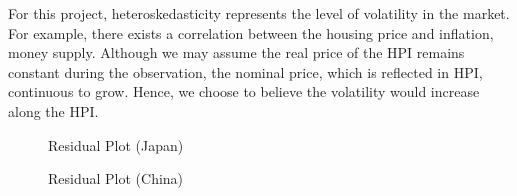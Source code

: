 \documentclass[11pt]{article}
\begin{document}
For this project, heteroskedasticity represents the level of volatility in the market. For example, there exists a correlation between the housing price and inflation, money supply. Although we may assume the real price of the HPI remains constant during the observation, the nominal price, which is reflected in HPI, continuous to grow. Hence, we choose to believe the volatility would increase along the HPI\citep{Heteroskedasticity1,Heteroskedasticity2}.

\begin{figure}[H]
\centering
{}\hfill
{}\hfill
\caption{Residual Plot (Japan)} \label{fig:res_JPN}
\end{figure}

\begin{figure}[H]
\centering
{}\hfill
{}\hfill
\caption{Residual Plot (China)} \label{fig:res_CHN}
\end{figure}
\end{document}
